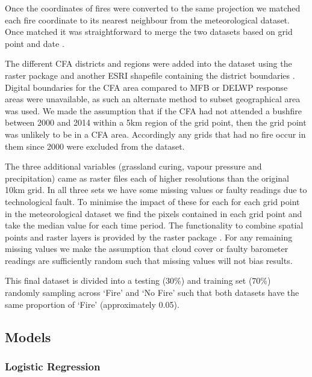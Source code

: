 \documentclass[11pt,a4paper]{article}
\begin{document}
Once the coordinates of fires were converted to the same projection we matched each fire coordinate to its nearest neighbour from the meteorological dataset. Once matched it was straightforward to merge the two datasets based on grid point and date \citep{datatable}.

The different CFA districts and regions were added into the dataset using the raster package and another ESRI shapefile containing the district boundaries \citep{raster}.
Digital boundaries for the CFA area compared to MFB or DELWP response areas were unavailable, as such an alternate method to subset geographical area was used. We made the assumption that if the CFA had not attended a bushfire between 2000 and 2014 within a 5km region of the grid point, then the grid point was unlikely to be in a CFA area. Accordingly any grids that had no fire occur in them since 2000 were excluded from the dataset.

The three additional variables (grassland curing, vapour pressure and precipitation) came as raster files each of higher resolutions than the original 10km grid. In all three sets we have some missing values or faulty readings due to technological fault. To minimise the impact of these for each for each grid point in the meteorological dataset we find the pixels contained in each grid point and take the median value for each time period. The functionality to combine spatial points and raster layers is provided by the raster package \citep{raster}. For any remaining missing values we make the assumption that cloud cover or faulty barometer readings are sufficiently random such that missing values will not bias results.


This final dataset is divided into a testing (30\%) and training set (70\%) randomly sampling across `Fire' and `No Fire' such that both datasets have the same proportion of `Fire' (approximately 0.05).

\subsection{Models}

\subsubsection{Logistic Regression}
\end{document}
